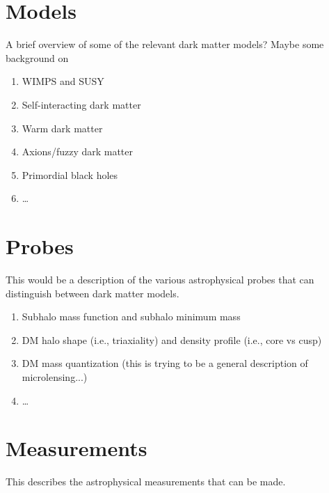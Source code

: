 \section{Models}
\label{sec:models}

A brief overview of some of the relevant dark matter models? Maybe some background on 

\begin{enumerate}
\item WIMPS and SUSY
\item Self-interacting dark matter
\item Warm dark matter
\item Axions/fuzzy dark matter
\item Primordial black holes  
\item \ldots
\end{enumerate}


\section{Probes}
\label{sec:probes}

This would be a description of the various astrophysical probes that can distinguish between dark matter models.
\begin{enumerate}
\item Subhalo mass function and subhalo minimum mass
\item DM halo shape (i.e., triaxiality) and density profile (i.e., core vs cusp)
\item DM mass quantization (this is trying to be a general description of microlensing...)
\item \ldots
\end{enumerate}

\section{Measurements}
\label{sec:measurements}

This describes the astrophysical measurements that can be made.

